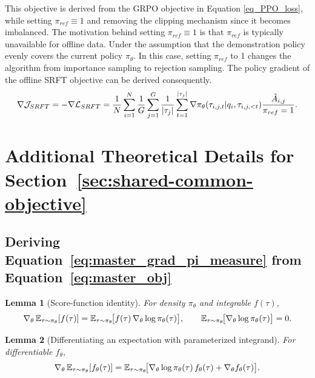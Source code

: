 This objective is derived from the GRPO objective in Equation \eqref{eq_PPO_loss}, while setting $\pi_{ref} \equiv 1$ and removing the clipping mechanism since it becomes imbalanced.
The motivation behind setting $\pi_{ref} \equiv 1$ is that $\pi_{ref}$ is typically unavailable for offline data. Under the assumption that the demonstration policy evenly covers the current policy $\pi_\theta$. In this case, setting $\pi_{ref}$ to 1 changes the algorithm from importance sampling to rejection sampling.
The policy gradient of the offline SRFT objective can be derived consequently.
\begin{equation}\label{eq_SRFT_grad}
    \nabla \mathcal{J}_{SRFT} = -\nabla \mathcal{L}_{SRFT} =     \frac{1}{N}\sum_{i=1}^N \frac{1}{G}\sum_{j=1}^G \frac{1}{|\tau_j|} \sum_{t=1}^{|\tau_j|} 
    \nabla \pi_\theta (\tau_{i,j,t} |q_i, \tau_{i,j, <t} )  \frac{\hat{A}_{i,j} }{\pi_{ref} = 1} .
\end{equation}




\section{Additional Theoretical Details for Section~\ref{sec:shared-common-objective}}
\label{app:theory-details}

\newtheorem{propositionA}{Proposition}
\renewcommand{\thepropositionA}{A\arabic{propositionA}}
\newtheorem{theoremA}{Theorem}
\renewcommand{\thetheoremA}{A\arabic{theoremA}}
\newtheorem{lemmaA}{Lemma}
\renewcommand{\thelemmaA}{A\arabic{lemmaA}}
\newtheorem{corollaryA}{Corollary}
\renewcommand{\thecorollaryA}{A\arabic{corollaryA}}
\newtheorem{remarkA}{Remark}
\renewcommand{\theremarkA}{A\arabic{remarkA}}

\subsection{Deriving Equation~\ref{eq:master_grad_pi_measure} from Equation~\ref{eq:master_obj}}
\label{app:derivation}

\begin{lemmaA}[Score-function identity]
\label{lemA:score}
For density $\pi_\theta$ and integrable $f(\tau)$,
\[
\nabla_\theta \,\mathbb{E}_{\tau\sim \pi_\theta}[f(\tau)]
=\mathbb{E}_{\tau\sim \pi_\theta}\!\big[f(\tau)\,\nabla_\theta \log \pi_\theta(\tau)\big],
\qquad
\mathbb{E}_{\tau\sim \pi_\theta}\!\big[\nabla_\theta \log \pi_\theta(\tau)\big]=0.
\]
\end{lemmaA}

\begin{lemmaA}[Differentiating an expectation with parameterized integrand]
\label{lemA:param-int}
For differentiable $f_\theta$,
\[
\nabla_\theta \,\mathbb{E}_{\tau\sim \pi_\theta}[f_\theta(\tau)]
= \mathbb{E}_{\tau\sim \pi_\theta}\!\big[\nabla_\theta \log \pi_\theta(\tau)\,f_\theta(\tau)+\nabla_\theta f_\theta(\tau)\big].
\]
\end{lemmaA}

